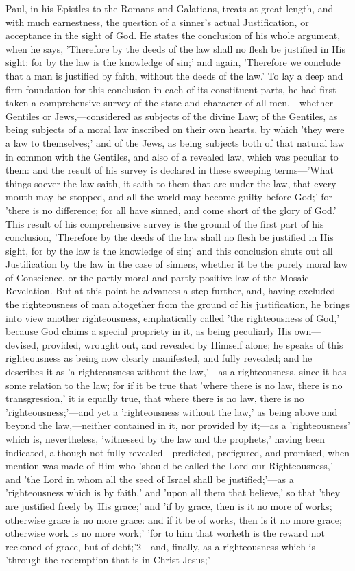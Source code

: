 \documentclass[
]{book}
\begin{document}
Paul, in his Epistles to the Romans and Galatians, treats at great length, and with much earnestness, the question of a sinner's actual Justification, or acceptance in the sight of God. He states the conclusion of his whole argument, when he says, 'Therefore by the deeds of the law shall no flesh be justified in His sight: for by the law is the knowledge of sin;' and again, 'Therefore we conclude that a man is justified by faith, without the deeds of the law.' To lay a deep and firm foundation for this conclusion in each of its constituent parts, he had first taken a comprehensive survey of the state and character of all men,---whether Gentiles or Jews,---considered as subjects of the divine Law; of the Gentiles, as being subjects of a moral law inscribed on their own hearts, by which 'they were a law to themselves;' and of the Jews, as being subjects both of that natural law in common with the Gentiles, and also of a revealed law, which was peculiar to them: and the result of his survey is declared in these sweeping terms---'What things soever the law saith, it saith to them that are under the law, that every mouth may be stopped, and all the world may become guilty before God;' for 'there is no difference; for all have sinned, and come short of the glory of God.' This result of his comprehensive survey is the ground of the first part of his conclusion, 'Therefore by the deeds of the law shall no flesh be justified in His sight, for by the law is the knowledge of sin;' and this conclusion shuts out all Justification by the law in the case of sinners, whether it be the purely moral law of Conscience, or the partly moral and partly positive law of the Mosaic Revelation. But at this point he advances a step further, and, having excluded the righteousness of man altogether from the ground of his justification, he brings into view another righteousness, emphatically called 'the righteousness of God,' because God claims a special propriety in it, as being peculiarly His own---devised, provided, wrought out, and revealed by Himself alone; he speaks of this righteousness as being now clearly manifested, and fully revealed; and he describes it as 'a righteousness without the law,'---as a righteousness, since it has some relation to the law; for if it be true that 'where there is no law, there is no transgression,' it is equally true, that where there is no law, there is no 'righteousness;'---and yet a 'righteousness without the law,' as being above and beyond the law,---neither contained in it, nor provided by it;---as a 'righteousness' which is, nevertheless, 'witnessed by the law and the prophets,' having been indicated, although not fully revealed---predicted, prefigured, and promised, when mention was made of Him who 'should be called the Lord our Righteousness,' and 'the Lord in whom all the seed of Israel shall be justified;'---as a 'righteousness which is by faith,' and 'upon all them that believe,' so that 'they are justified freely by His grace;' and 'if by grace, then is it no more of works; otherwise grace is no more grace: and if it be of works, then is it no more grace; otherwise work is no more work;' 'for to him that worketh is the reward not reckoned of grace, but of debt;'2---and, finally, as a righteousness which is 'through the redemption that is in Christ Jesus;' 
\end{document}
